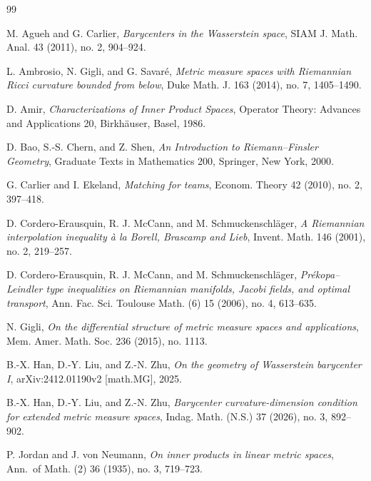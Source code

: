 \documentclass[a4paper,11pt]{article}
\numberwithin{equation}{section}
\begin{document}
	
	
	\begin{thebibliography}{99}
		
		M. Agueh and G. Carlier,
		\emph{Barycenters in the Wasserstein space},
		SIAM J. Math. Anal. 43 (2011), no. 2, 904--924.
		
		L. Ambrosio, N. Gigli, and G. Savar\'e,
		\emph{Metric measure spaces with Riemannian Ricci curvature bounded from below},
		Duke Math. J. 163 (2014), no. 7, 1405--1490.
		
		D. Amir,
		\emph{Characterizations of Inner Product Spaces},
		Operator Theory: Advances and Applications 20, Birkh\"auser, Basel, 1986.
		
		D. Bao, S.-S. Chern, and Z. Shen,
		\emph{An Introduction to Riemann--Finsler Geometry},
		Graduate Texts in Mathematics 200, Springer, New York, 2000.
		
		G. Carlier and I. Ekeland,
		\emph{Matching for teams},
		Econom. Theory 42 (2010), no. 2, 397--418.
		
		D. Cordero-Erausquin, R. J. McCann, and M. Schmuckenschl\"ager,
		\emph{A Riemannian interpolation inequality \`a la Borell, Brascamp and Lieb},
		Invent. Math. 146 (2001), no. 2, 219--257.
		
		D. Cordero-Erausquin, R. J. McCann, and M. Schmuckenschl\"ager,
		\emph{Pr\'ekopa--Leindler type inequalities on Riemannian manifolds, Jacobi fields, and optimal transport},
		Ann. Fac. Sci. Toulouse Math. (6) 15 (2006), no. 4, 613--635.
		
		N. Gigli,
		\emph{On the differential structure of metric measure spaces and applications},
		Mem. Amer. Math. Soc. 236 (2015), no. 1113.
		
		
		
		B.-X. Han, D.-Y. Liu, and Z.-N. Zhu,
		\emph{On the geometry of Wasserstein barycenter I},
		arXiv:2412.01190v2 [math.MG], 2025.
		
		B.-X. Han, D.-Y. Liu, and Z.-N. Zhu,
		\emph{Barycenter curvature-dimension condition for extended metric measure spaces},
		Indag. Math. (N.S.) 37 (2026), no. 3, 892--902.
		
		P. Jordan and J. von Neumann,
		\emph{On inner products in linear metric spaces},
		Ann.\ of Math. (2) 36 (1935), no. 3, 719--723.
		

\end{thebibliography}
\end{document}
